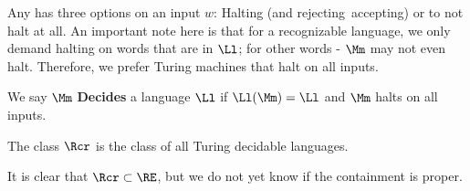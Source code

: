 Any \TM has three options on an input $w$: Halting (and rejecting\ accepting) or to not halt at all. An important note here is that for a recognizable language, we only demand halting on words that are in $\Ll$; for other words - $\Mm$ may not even halt. Therefore, we prefer Turing machines that halt on all inputs.

\begin{yellowBox}
	\begin{defn}
		We say $\Mm$ \textbf{Decides} a language $\Ll$ if $\Ll(\Mm) = \Ll$ and $\Mm$ halts on all inputs.
	\end{defn}
	\begin{defn}
		 The class $\Rcr$ is the class of all Turing decidable languages.
	\end{defn}
	\begin{remark}
		It is clear that $\Rcr\subset \RE$, but we do not yet know if the containment is proper.
	\end{remark}
\end{yellowBox}
